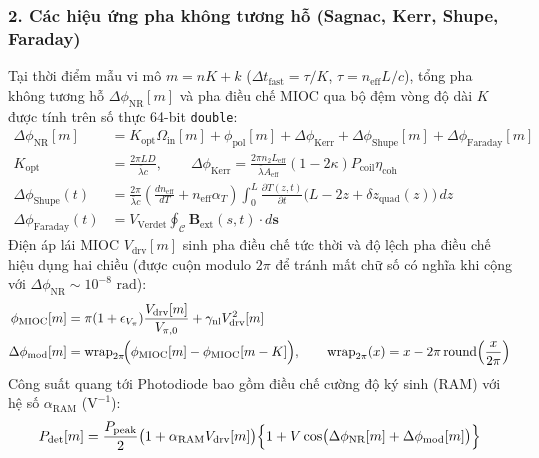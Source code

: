 \documentclass[11pt, a4paper]{article}
\begin{document}
\subsubsection*{2. Các hiệu ứng pha không tương hỗ (Sagnac, Kerr, Shupe, Faraday)}
Tại thời điểm mẫu vi mô $m = nK + k$ ($\Delta t_{\text{fast}} = \tau / K$, $\tau = n_{\text{eff}} L / c$), tổng pha không tương hỗ $\Delta\phi_{\text{NR}}[m]$ và pha điều chế MIOC qua bộ đệm vòng độ dài $K$ được tính trên số thực 64-bit \texttt{double}:
\begin{align}
\Delta\phi_{\text{NR}}[m] &= K_{\text{opt}} \Omega_{\text{in}}[m] + \phi_{\text{pol}}[m] + \Delta\phi_{\text{Kerr}} + \Delta\phi_{\text{Shupe}}[m] + \Delta\phi_{\text{Faraday}}[m] \\
K_{\text{opt}} &= \frac{2\pi L D}{\bar{\lambda} c}, \qquad
\Delta\phi_{\text{Kerr}} = \frac{2\pi n_2 L_{\text{eff}}}{\bar{\lambda} A_{\text{eff}}} (1 - 2\kappa) P_{\text{coil}} \eta_{\text{coh}} \\
\Delta\phi_{\text{Shupe}}(t) &= \frac{2\pi}{\bar{\lambda} c}\left(\frac{dn_{\text{eff}}}{dT} + n_{\text{eff}}\alpha_T\right)\int_0^L \frac{\partial T(z,t)}{\partial t}\bigl(L - 2z + \delta z_{\text{quad}}(z)\bigr)\,dz \\
\Delta\phi_{\text{Faraday}}(t) &= V_{\text{Verdet}} \oint_{\mathcal{C}} \mathbf{B}_{\text{ext}}(s, t)\cdot d\mathbf{s}
\end{align}
Điện áp lái MIOC $V_{\text{drv}}[m]$ sinh pha điều chế tức thời và độ lệch pha điều chế hiệu dụng hai chiều (được cuộn modulo $2\pi$ để tránh mất chữ số có nghĩa khi cộng với $\Delta\phi_{\text{NR}} \sim 10^{-8}\text{ rad}$):
\begin{align}
\phi_{\text{MIOC}}[m] &= \pi (1 + \epsilon_{V_\pi}) \frac{V_{\text{drv}}[m]}{V_{\pi,0}} + \gamma_{\text{nl}} V_{\text{drv}}^2[m] \\
\Delta\phi_{\text{mod}}[m] &= \operatorname{wrap}_{2\pi}\!\Bigl(\phi_{\text{MIOC}}[m] - \phi_{\text{MIOC}}[m-K]\Bigr), \qquad \operatorname{wrap}_{2\pi}(x) = x - 2\pi\operatorname{round}\!\left(\frac{x}{2\pi}\right)
\end{align}
Công suất quang tới Photodiode bao gồm điều chế cường độ ký sinh (RAM) với hệ số $\alpha_{\text{RAM}}$ ($\text{V}^{-1}$):
\begin{equation}
P_{\text{det}}[m] = \frac{P_{\text{peak}}}{2}\bigl(1 + \alpha_{\text{RAM}} V_{\text{drv}}[m]\bigr)\Bigl\{1 + V\cos\bigl(\Delta\phi_{\text{NR}}[m] + \Delta\phi_{\text{mod}}[m]\bigr)\Bigr\}
\end{equation}
\end{document}
